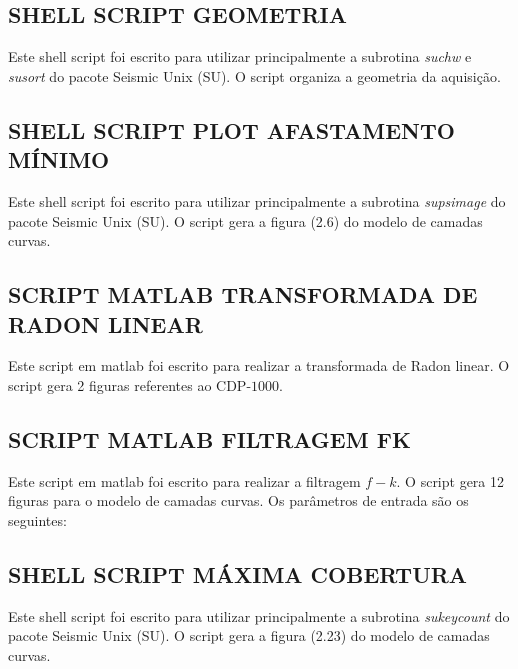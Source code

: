 \subsection{SHELL SCRIPT GEOMETRIA}
\label{apendice_D}

Este shell script foi escrito para utilizar principalmente a  subrotina \textit{suchw} e \textit{susort} do pacote Seismic Unix (SU). 
O script organiza a geometria da aquisição.


\newpage
\subsection{SHELL SCRIPT PLOT AFASTAMENTO MÍNIMO}
\label{apendice_E}

Este shell script foi escrito para utilizar principalmente a subrotina \textit{supsimage} do pacote Seismic Unix (SU).
O script gera a figura (2.6) do modelo de camadas curvas.


\newpage
\subsection{SCRIPT MATLAB TRANSFORMADA DE RADON LINEAR}
\label{apendice_F}
Este script em matlab foi escrito para realizar a transformada de Radon linear. O script gera 2 figuras referentes ao CDP-$1000$.



\newpage
\subsection{SCRIPT MATLAB FILTRAGEM FK}
\label{apendice_G}
Este script em matlab foi escrito para realizar a filtragem $f-k$. O script gera 12 figuras para o modelo de camadas curvas.
Os parâmetros de entrada são os seguintes:


\newpage
\subsection{SHELL SCRIPT MÁXIMA COBERTURA}
\label{apendice_H}
Este shell script foi escrito para utilizar principalmente a subrotina \textit{sukeycount} do pacote Seismic Unix (SU).
O script gera a figura (2.23) do modelo de camadas curvas.




